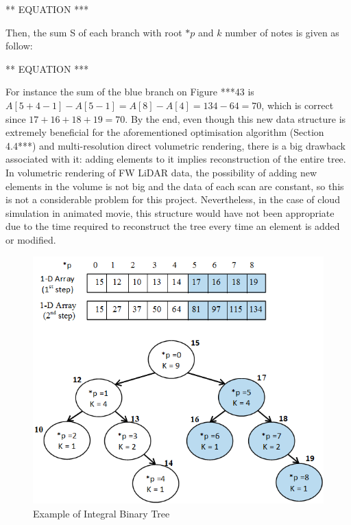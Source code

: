 \documentclass{subfiles}
\begin{document}
\par *** EQUATION ***


\par Then, the sum S of each branch with root $*p$ and $k$ number of notes is given as follow:


\par *** EQUATION ***

For instance the sum of the blue branch on Figure ***43 is $A[5+4-1]-A[5-1] = A[8]-A[4] = 134-64 = 70$, which is correct since $17+16+18+19=70$.
By the end, even though this new data structure is extremely beneficial for the aforementioned optimisation algorithm (Section 4.4***) and multi-resolution direct volumetric rendering, there is a big drawback associated with it: adding elements to it implies reconstruction of the entire tree. In volumetric rendering of FW LiDAR data, the possibility of adding new elements in the volume is not big and the data of each scan are constant, so this is not a considerable problem for this project. Nevertheless, in the case of cloud simulation in animated movie, this structure would have not been appropriate due to the time required to reconstruct the tree every time an element is added or modified. 


\begin{figure}[!htbp]
	\centering
	\includegraphics[width=5.5in]{img/IntegralBinaryTree}
	\caption{Example of Integral Binary Tree}
	\label{fig:IntegralBinaryTree}
\end{figure}
\end{document}
